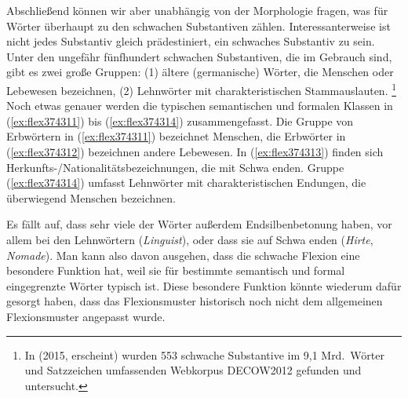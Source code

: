 Abschließend können wir aber unabhängig von der Morphologie fragen, was für Wörter überhaupt zu den schwachen Substantiven zählen.
Interessanterweise ist nicht jedes Substantiv gleich prädestiniert, ein schwaches Substantiv zu sein.
Unter den ungefähr fünfhundert schwachen Substantiven, die im Gebrauch sind, gibt es zwei große Gruppen:
(1) ältere (germanische) Wörter, die Menschen oder Lebewesen bezeichnen,
(2) Lehnwörter mit charakteristischen Stammauslauten.%
\footnote{In \citeauthor{Schaefer2015b} (2015, erscheint) wurden 553 schwache Substantive im 9,1 Mrd.\ Wörter und Satzzeichen umfassenden Webkorpus DECOW2012 gefunden und untersucht.}
Noch etwas genauer werden die typischen semantischen und formalen Klassen in (\ref{ex:flex374311}) bis (\ref{ex:flex374314}) zusammengefasst.
Die Gruppe von Erbwörtern in (\ref{ex:flex374311}) bezeichnet Menschen, die Erbwörter in (\ref{ex:flex374312}) bezeichnen andere Lebewesen.
In (\ref{ex:flex374313}) finden sich Herkunfts-\slash Nationalitätsbezeichnungen, die mit Schwa enden.
Gruppe (\ref{ex:flex374314}) umfasst Lehnwörter mit charakteristischen Endungen, die überwiegend Menschen bezeichnen.

\begin{exe}
\end{exe}

Es fällt auf, dass sehr viele der Wörter außerdem Endsilbenbetonung haben, vor allem bei den Lehnwörtern (\textit{Lingu\Akz ist}), oder dass sie auf Schwa enden (\textit{Hirte}, \textit{Nomade}).
Man kann also davon ausgehen, dass die schwache Flexion eine besondere Funktion hat, weil sie für bestimmte semantisch und formal eingegrenzte Wörter typisch ist.
Diese besondere Funktion könnte wiederum dafür gesorgt haben, dass das Flexionsmuster historisch noch nicht dem allgemeinen Flexionsmuster angepasst wurde.

